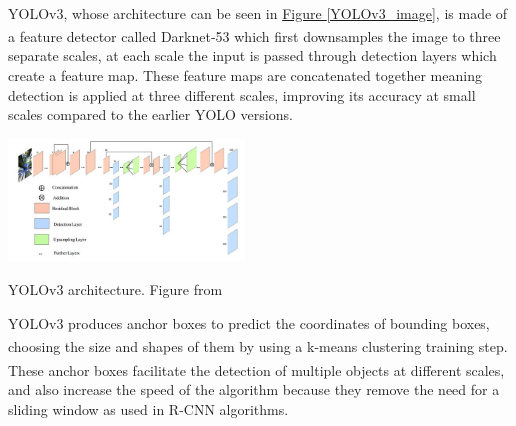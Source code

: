 \documentclass[11pt]{article}		%
\newcommand{\supercite}[1]{\textsuperscript{\cite{#1}}}		%
\newcommand{\figref}[1]{\hyperref[#1]{Figure \ref*{#1}}}    %
\begin{document}
            \\
            \hspace*{2ex}YOLOv3, whose architecture can be seen in \figref{YOLOv3_image}, is made of a feature detector called Darknet-53\supercite{YOLOV3} which first downsamples the image to three separate scales, at each scale the input is passed through detection layers which create a feature map. These feature maps are concatenated together meaning detection is applied at three different scales, improving its accuracy at small scales compared to the earlier YOLO versions.
	        \begin{floatingfigure}[r]{0.5\textwidth}
				\centering
			    \includegraphics[width=0.47\textwidth]{Network-architecture-of-YOLOv3_W640.jpg}
			    \caption{YOLOv3 architecture. Figure from \cite{YOLOv3_image}}
			    \label{YOLOv3_image}
			\end{floatingfigure}
			\hspace*{2ex} YOLOv3 produces anchor boxes to predict the coordinates of bounding boxes, choosing the size and shapes of them by using a k-means clustering training step\supercite{k-means-clustering}. These anchor boxes facilitate the detection of multiple objects at different scales\supercite{YOLOV2}, and also increase the speed of the algorithm because they remove the need for a sliding window as used in R-CNN algorithms.
	       
\end{document}
